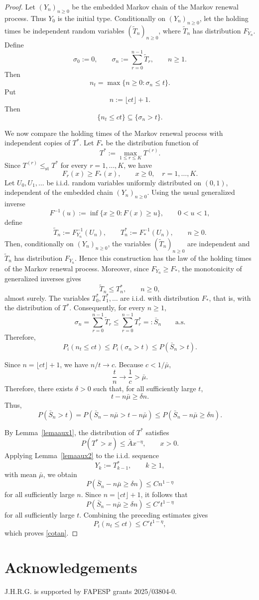 \documentclass[reqno,final,11pt]{amsart}
\newcommand{\1}{\mathbbm{1}}
\theoremstyle{plain}
\theoremstyle{definition}
\theoremstyle{remark}
\begin{document}
\begin{proof}
Let \((Y_n)_{n\ge0}\) be the embedded Markov chain of the Markov renewal
process. Thus \(Y_0\) is the initial type. Conditionally on
\((Y_n)_{n\ge0}\), let the holding times be independent random variables
\((\widetilde T_n)_{n\ge0}\), where \(\widetilde T_n\) has distribution
\(F_{Y_n}\). Define
\[
\sigma_0:=0,
\qquad
\sigma_n:=\sum_{r=0}^{n-1}\widetilde T_r,
\qquad n\ge1.
\]
Then
\[
n_t=\max\{n\ge0:\sigma_n\le t\}.
\]
Put
\[
n:=\lfloor ct\rfloor+1.
\]
Then
\[
\{n_t\le ct\}\subseteq \{\sigma_n>t\}.
\]

We now compare the holding times of the Markov renewal process with
independent copies of \(T^*\). Let \(F_*\) be the distribution function of
\[
T^*:=\max_{1\le r\le K}T^{(r)}.
\]
Since \(T^{(r)}\le_{\mathrm{st}}T^*\) for every \(r=1,\ldots,K\), we have
\[
F_r(x)\ge F_*(x),
\qquad x\ge0,\quad r=1,\ldots,K.
\]
Let \(U_0,U_1,\ldots\) be i.i.d. random variables uniformly distributed on
\((0,1)\), independent of the embedded chain \((Y_n)_{n\ge0}\). Using the
usual generalized inverse
\[
F^{-1}(u):=\inf\{x\ge0:F(x)\ge u\},
\qquad 0<u<1,
\]
define
\[
\widetilde T_n:=F_{Y_n}^{-1}(U_n),
\qquad
T_n^*:=F_*^{-1}(U_n),
\qquad n\ge0.
\]
Then, conditionally on \((Y_n)_{n\ge0}\), the variables
\((\widetilde T_n)_{n\ge0}\) are independent and \(\widetilde T_n\) has
distribution \(F_{Y_n}\). Hence this construction has the law of the holding
times of the Markov renewal process. Moreover, since
\(F_{Y_n}\ge F_*\), the monotonicity of generalized inverses gives
\[
\widetilde T_n\le T_n^*,
\qquad n\ge0,
\]
almost surely. The variables \(T_0^*,T_1^*,\ldots\) are i.i.d. with
distribution \(F_*\), that is, with the distribution of \(T^*\). Consequently,
for every \(n\ge1\),
\[
\sigma_n
=
\sum_{r=0}^{n-1}\widetilde T_r
\le
\sum_{r=0}^{n-1}T_r^*
=:\bar S_n
\qquad\text{a.s.}
\]
Therefore,
\[
P_i(n_t\le ct)
\le
P_i(\sigma_n>t)
\le
P(\bar S_n>t).
\]

Since \(n=\lfloor ct\rfloor+1\), we have \(n/t\to c\). Because
\(c<1/\bar\mu\),
\[
\frac{t}{n}\longrightarrow \frac1c>\bar\mu.
\]
Therefore, there exists \(\delta>0\) such that, for all sufficiently large
\(t\),
\[
t-n\bar\mu\ge \delta n.
\]
Thus,
\[
P(\bar S_n>t)
=
P(\bar S_n-n\bar\mu>t-n\bar\mu)
\le
P(\bar S_n-n\bar\mu\ge \delta n).
\]

By Lemma~\ref{lemaaux1}, the distribution of \(T^*\) satisfies
\[
P(T^*>x)\le \bar A x^{-\eta},
\qquad x>0.
\]
 Applying Lemma~\ref{lemaaux2} to the i.i.d. sequence
 \[
 Y_k:=T_{k-1}^*,
 \qquad k\ge1,
 \]
 with mean \(\bar\mu\), we obtain
 \[
 P(\bar S_n-n\bar\mu\ge \delta n)
 \le
 C n^{1-\eta}
 \]
 for all sufficiently large \(n\). Since \(n=\lfloor ct\rfloor+1\), it follows
that
\[
P(\bar S_n-n\bar\mu\ge \delta n)
\le
C' t^{1-\eta}
\]
for all sufficiently large \(t\). Combining the preceding estimates gives
\[
P_i(n_t\le ct)
\le
C' t^{1-\eta},
\]
which proves \eqref{cotan}.
\end{proof}
\section*{Acknowledgements}
J.H.R.G. is  supported by FAPESP grants  2025/03804-0.










\end{document}
